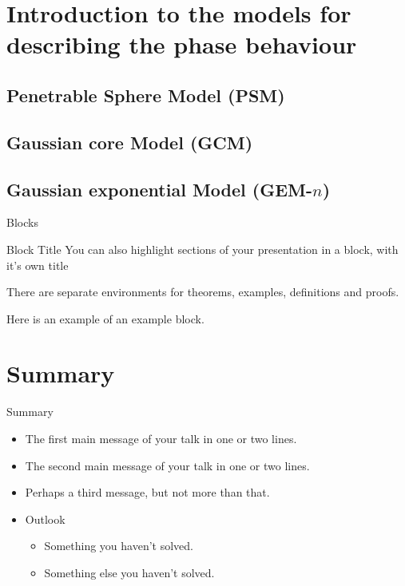 \documentclass{beamer}
\begin{document}
\section{Introduction to the models for describing the phase behaviour}

\subsection{Penetrable Sphere Model (PSM)}
\subsection{Gaussian core Model (GCM)}
\subsection{Gaussian exponential Model (GEM-$n$)}

\begin{frame}{Blocks}
\begin{block}{Block Title}
You can also highlight sections of your presentation in a block, with it's own title
\end{block}
\begin{theorem}
There are separate environments for theorems, examples, definitions and proofs.
\end{theorem}
\begin{example}
Here is an example of an example block.
\end{example}
\end{frame}

\section*{Summary}

\begin{frame}{Summary}
\begin{itemize}
\item
The \alert{first main message} of your talk in one or two lines.
\item
The \alert{second main message} of your talk in one or two lines.
\item
Perhaps a \alert{third message}, but not more than that.
\end{itemize}

\begin{itemize}
\item
Outlook
\begin{itemize}
\item
Something you haven't solved.
\item
Something else you haven't solved.
\end{itemize}
\end{itemize}
\end{frame}
\end{document}
